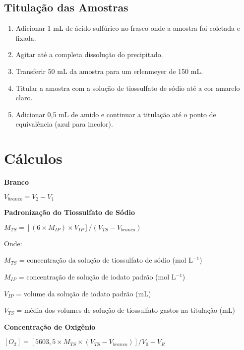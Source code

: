 \documentclass[a4paper,10pt]{SelfArx}
\begin{document}
\subsection{Titulação das Amostras}
\begin{enumerate}[noitemsep]
\item Adicionar 1 mL de ácido sulfúrico no  frasco onde a amostra foi coletada e fixada.
\item Agitar até a completa dissolução do precipitado. 
\item Transferir 50 mL da amostra para um erlenmeyer de 150 mL. 
\item Titular a amostra com a solução de tiossulfato de sódio até a cor amarelo claro. 
\item Adicionar 0,5 mL de amido e continuar a titulação até o ponto de equivalência (azul para incolor).

\end{enumerate}

\section{Cálculos}

\indent 
\textbf {Branco}

\begin{center}
$V_{branco} = V_2 - V_1$
\end{center}

\noindent
\textbf {Padronização do Tiossulfato de Sódio}

\begin{center}
$M_{TS} = [(6 \times M_{IP}) \times V_{IP}]/ (V_{TS} - V_{branco}) $
\end {center}
    
Onde:

$M_{TS}$ = concentração da solução de tiossulfato de sódio (mol L$^{-1}$)

$M_{IP}$ = concentração de solução de iodato padrão (mol L$^{-1}$)

$V_{IP}$ = volume da solução de iodato padrão (mL)

$V_{TS}$ = média dos volumes de solução de tiossulfato gastos na titulação (mL)

\vspace{0.15cm}
\noindent
\textbf {Concentração de Oxigênio }

\begin{center}
$[O_2] = [5603,5 \times M_{TS} \times (V_{TS} -  V_{branco})] / V_0 - V_R$
\end{center}
\end{document}

